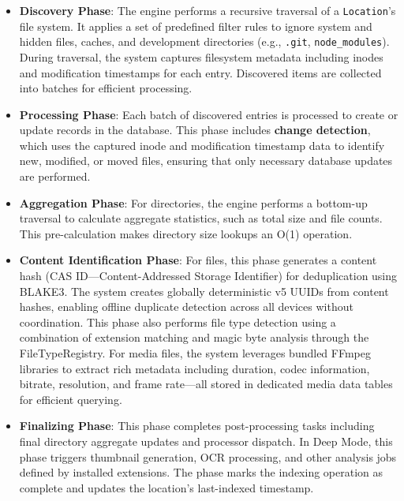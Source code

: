 \documentclass[sigconf]{acmart}
\begin{document}
\begin{itemize}[noitemsep, topsep=0pt]
 \item \textbf{Discovery Phase}: The engine performs a recursive traversal of a \texttt{Location}'s file system. It applies a set of predefined filter rules to ignore system and hidden files, caches, and development directories (e.g., \texttt{.git}, \texttt{node\_modules}). During traversal, the system captures filesystem metadata including inodes and modification timestamps for each entry. Discovered items are collected into batches for efficient processing.

 \item \textbf{Processing Phase}: Each batch of discovered entries is processed to create or update records in the database. This phase includes \textbf{change detection}, which uses the captured inode and modification timestamp data to identify new, modified, or moved files, ensuring that only necessary database updates are performed.

 \item \textbf{Aggregation Phase}: For directories, the engine performs a bottom-up traversal to calculate aggregate statistics, such as total size and file counts. This pre-calculation makes directory size lookups an O(1) operation.

 \item \textbf{Content Identification Phase}: For files, this phase generates a content hash (CAS ID---Content-Addressed Storage Identifier) for deduplication using BLAKE3. The system creates globally deterministic v5 UUIDs from content hashes, enabling offline duplicate detection across all devices without coordination. This phase also performs file type detection using a combination of extension matching and magic byte analysis through the FileTypeRegistry. For media files, the system leverages bundled FFmpeg libraries to extract rich metadata including duration, codec information, bitrate, resolution, and frame rate---all stored in dedicated media data tables for efficient querying.

 \item \textbf{Finalizing Phase}: This phase completes post-processing tasks including final directory aggregate updates and processor dispatch. In Deep Mode, this phase triggers thumbnail generation, OCR processing, and other analysis jobs defined by installed extensions. The phase marks the indexing operation as complete and updates the location's last-indexed timestamp.

\end{itemize}
\end{document}
